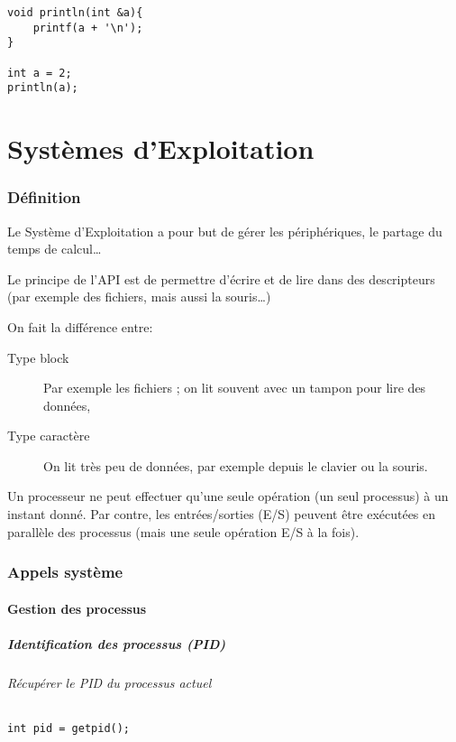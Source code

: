 \documentclass[10pt,a4paper,french]{article}
\begin{document}
\begin{verbatim}
void println(int &a){
    printf(a + '\n');
}

int a = 2;
println(a);
\end{verbatim}

\part{Systèmes d'Exploitation}

\section{Définition}

Le Système d'Exploitation a pour but de gérer les périphériques, le partage du temps de calcul\ldots

Le principe de l'API est de permettre d'écrire et de lire dans des descripteurs (par exemple des fichiers, mais aussi la souris\ldots)

On fait la différence entre:
\begin{description}
\item[Type block] Par exemple les fichiers ; on lit souvent avec un tampon pour lire des données,
\item[Type caractère] On lit très peu de données, par exemple depuis le clavier ou la souris.
\end{description}

Un processeur ne peut effectuer qu'une seule opération (un seul processus) à un instant donné. Par contre, les entrées/sorties (E/S) peuvent être exécutées en parallèle des processus (mais une seule opération E/S à la fois).

\section{Appels système}

\subsection{Gestion des processus}

\subsubsection{Identification des processus (PID)}

\paragraph{Récupérer le PID du processus actuel}
\begin{verbatim}
int pid = getpid();
\end{verbatim}
\end{document}

